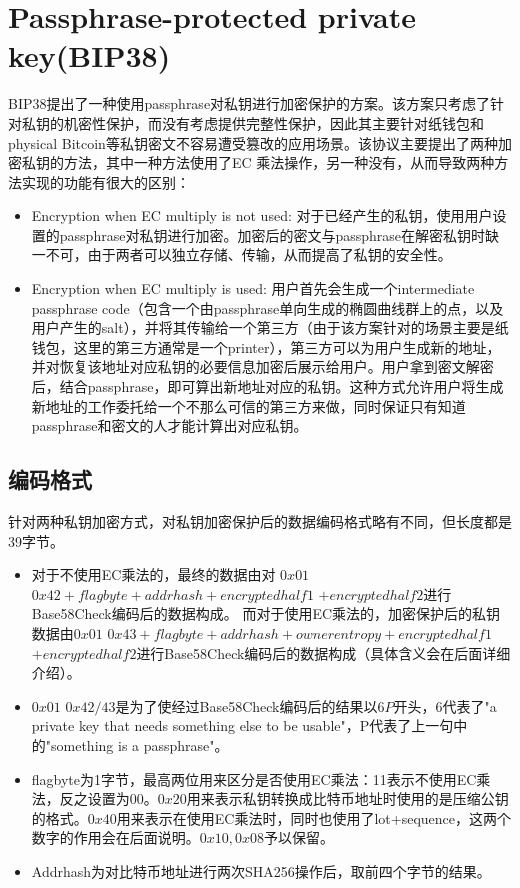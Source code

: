 \section{Passphrase-protected private key(BIP38)}
BIP38提出了一种使用passphrase对私钥进行加密保护的方案。该方案只考虑了针对私钥的机密性保护，而没有考虑提供完整性保护，因此其主要针对纸钱包和physical Bitcoin等私钥密文不容易遭受篡改的应用场景。该协议主要提出了两种加密私钥的方法，其中一种方法使用了EC 乘法操作，另一种没有，从而导致两种方法实现的功能有很大的区别：
\begin{itemize}
\item Encryption when EC multiply is not used: 对于已经产生的私钥，使用用户设置的passphrase对私钥进行加密。加密后的密文与passphrase在解密私钥时缺一不可，由于两者可以独立存储、传输，从而提高了私钥的安全性。
\item Encryption when EC multiply is used: 用户首先会生成一个intermediate passphrase code（包含一个由passphrase单向生成的椭圆曲线群上的点，以及用户产生的salt），并将其传输给一个第三方（由于该方案针对的场景主要是纸钱包，这里的第三方通常是一个printer），第三方可以为用户生成新的地址，并对恢复该地址对应私钥的必要信息加密后展示给用户。用户拿到密文解密后，结合passphrase，即可算出新地址对应的私钥。这种方式允许用户将生成新地址的工作委托给一个不那么可信的第三方来做，同时保证只有知道passphrase和密文的人才能计算出对应私钥。
\end{itemize}


\subsection{ 编码格式}
针对两种私钥加密方式，对私钥加密保护后的数据编码格式略有不同，但长度都是39字节。
\begin{itemize}
\item 对于不使用EC乘法的，最终的数据由对 $0x01$ $0x42+ flagbyte+ addrhash+ encryptedhalf1$ $+ encryptedhalf2$进行Base58Check编码后的数据构成。
而对于使用EC乘法的，加密保护后的私钥数据由$0x01$ $0x43+ flagbyte+ addrhash+ ownerentropy+ encryptedhalf1$ $+ encryptedhalf2$进行Base58Check编码后的数据构成（具体含义会在后面详细介绍）。

\item $0x01$ $0x42/43$是为了使经过Base58Check编码后的结果以$6P$开头，6代表了"a private key that needs something else to be usable"，P代表了上一句中的"something is a passphrase"。

\item flagbyte为1字节，最高两位用来区分是否使用EC乘法：11表示不使用EC乘法，反之设置为00。$0x20$用来表示私钥转换成比特币地址时使用的是压缩公钥的格式。$0x40$用来表示在使用EC乘法时，同时也使用了lot+sequence，这两个数字的作用会在后面说明。$0x10,0x08$予以保留。

\item Addrhash为对比特币地址进行两次SHA256操作后，取前四个字节的结果。
\end{itemize}


